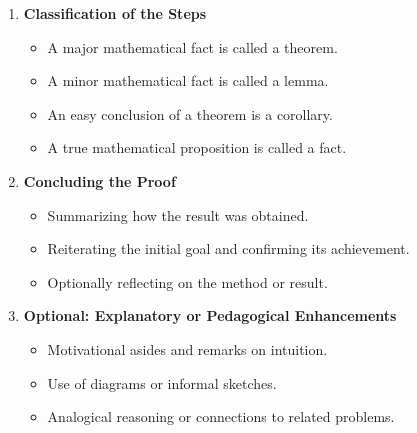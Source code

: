 \documentclass[12pt]{article}
\begin{document}
\begin{enumerate}[label=\textbf{\arabic*.}]
    \item \textbf{Classification of the Steps}
    \begin{itemize}
        \item A major mathematical fact is called a theorem. 
        \item A minor mathematical fact is called a lemma.
        \item An easy conclusion of a theorem is a corollary. 
        \item A true mathematical proposition is called a fact. 
    \end{itemize}
    
    \item \textbf{Concluding the Proof}
    \begin{itemize}
        \item Summarizing how the result was obtained.
        \item Reiterating the initial goal and confirming its achievement.
        \item Optionally reflecting on the method or result.
    \end{itemize}

    \item \textbf{Optional: Explanatory or Pedagogical Enhancements}
    \begin{itemize}
        \item Motivational asides and remarks on intuition.
        \item Use of diagrams or informal sketches.
        \item Analogical reasoning or connections to related problems.
    \end{itemize}

\end{enumerate}
\end{document}
